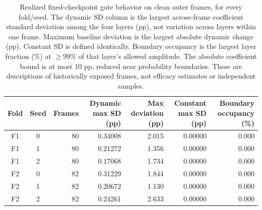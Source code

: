 \begin{table}[t]
\centering
\footnotesize
\setlength{\tabcolsep}{4.0pt}
\caption{Realized fixed-checkpoint gate behavior on clean outer frames, for every fold/seed. The dynamic SD column is the largest across-frame coefficient standard deviation among the four layers (pp), not variation across layers within one frame. Maximum baseline deviation is the largest absolute dynamic change (pp). Constant SD is defined identically. Boundary occupancy is the largest layer fraction (\%) at $\geq99\%$ of that layer's allowed amplitude. The absolute coefficient bound is at most 10 pp, reduced near probability boundaries. These are descriptions of historically exposed frames, not efficacy estimates or independent samples.}
\label{tab:new_mechanisms}
\begin{tabular}{ccrrrrr}
\toprule
Fold & Seed & Frames & Dynamic max SD (pp) & Max deviation (pp) & Constant max SD (pp) & Boundary occupancy (\%) \\
\midrule
F1 & 0 & 80 & 0.34008 & 2.015 & 0.00000 & 0.000 \\
F1 & 1 & 80 & 0.21272 & 1.356 & 0.00000 & 0.000 \\
F1 & 2 & 80 & 0.17068 & 1.734 & 0.00000 & 0.000 \\
F2 & 0 & 82 & 0.31229 & 1.844 & 0.00000 & 0.000 \\
F2 & 1 & 82 & 0.20672 & 1.130 & 0.00000 & 0.000 \\
F2 & 2 & 82 & 0.24261 & 2.633 & 0.00000 & 0.000 \\
\bottomrule
\end{tabular}
\end{table}
